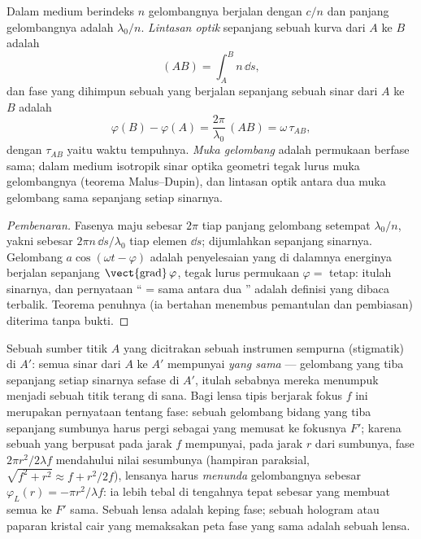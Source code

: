 \begin{definition}\label{def:b2:scalar-light-model:path}
Dalam medium berindeks $n$ gelombangnya berjalan dengan $c/n$ dan panjang gelombangnya
adalah $\lambda_0/n$. \emph{Lintasan optik} sepanjang sebuah kurva dari $A$ ke $B$ adalah
\[
(AB) = \int_A^Bn\,\dd s ,
\]
dan fase yang dihimpun sebuah  yang berjalan sepanjang
sebuah sinar dari $A$ ke $B$ adalah
\[
\varphi(B) - \varphi(A) = \frac{2\pi}{\lambda_0}\,(AB) = \omega\,\tau_{AB} ,
\]
dengan $\tau_{AB}$ yaitu waktu tempuhnya. \emph{Muka gelombang} adalah permukaan
berfase sama; dalam medium isotropik sinar optika geometri
tegak lurus muka gelombangnya (teorema Malus--Dupin), dan lintasan
optik antara dua muka gelombang sama sepanjang setiap sinarnya.
\end{definition}

\begin{proof}[Pembenaran]
Fasenya maju sebesar $2\pi$ tiap panjang gelombang setempat $\lambda_0/n$, yakni sebesar
$2\pi n\,\dd s/\lambda_0$ tiap elemen $\dd s$; dijumlahkan sepanjang sinarnya. Gelombang
$a\cos(\omega t - \varphi)$ adalah penyelesaian  yang di dalamnya
energinya berjalan sepanjang $\operatorname{\vect{grad}}\varphi$, tegak lurus
permukaan $\varphi =$ tetap: itulah sinarnya, dan pernyataan `` = sama
antara dua '' adalah definisi 
yang dibaca terbalik. Teorema penuhnya (ia bertahan menembus pemantulan dan
pembiasan) diterima tanpa bukti.
\end{proof}

\begin{example}\label{ex:b2:scalar-light-model:lens}
Sebuah sumber titik $A$ yang dicitrakan sebuah instrumen sempurna (stigmatik) di $A'$:
semua sinar dari $A$ ke $A'$ mempunyai \emph{ yang sama} ---
gelombang yang tiba sepanjang setiap sinarnya sefase di $A'$, itulah sebabnya mereka
menumpuk menjadi sebuah titik terang di sana. Bagi lensa tipis berjarak fokus $f$
ini merupakan pernyataan tentang fase: sebuah gelombang bidang yang tiba sepanjang sumbunya
harus pergi sebagai  yang memusat ke fokusnya $F'$; karena sebuah
 yang berpusat pada jarak $f$ mempunyai, pada jarak $r$ dari sumbunya,
fase $2\pi r^2/2\lambda f$ mendahului nilai sesumbunya (hampiran
paraksial, $\sqrt{f^2 + r^2} \approx f + r^2/2f$), lensanya harus
\emph{menunda} gelombangnya sebesar $\varphi_L(r) = -\pi r^2/\lambda f$: ia lebih tebal di
tengahnya tepat sebesar yang membuat semua  ke $F'$
sama. Sebuah lensa adalah keping fase; sebuah hologram atau paparan kristal cair
yang memaksakan peta fase yang sama adalah sebuah lensa.
\end{example}

